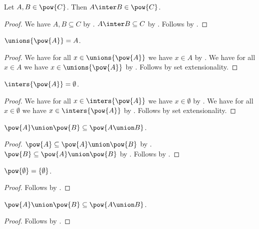 \begin{proposition}\label{inter_powerset}
    Let $A,B\in\pow{C}$.
    Then $A\inter B\in\pow{C}$.
\end{proposition}
\begin{proof}
    We have $A,B\subseteq C$ by .
    $A\inter B\subseteq C$ by .
    Follows by .
\end{proof}

\begin{proposition}\label{unions_powerset}
    $\unions{\pow{A}} = A$.
\end{proposition}
\begin{proof}
    We have for all $x\in\unions{\pow{A}}$
        we have $x\in A$ by .
    We have for all $x\in A$
        we have $x\in\unions{\pow{A}}$ by .
    Follows by set extensionality.
\end{proof}

\begin{proposition}\label{inters_powerset}
    $\inters{\pow{A}} = \emptyset$.
\end{proposition}
\begin{proof}
    We have for all $x\in\inters{\pow{A}}$
        we have $x\in\emptyset$
        by .
    We have for all $x\in\emptyset$
        we have $x\in\inters{\pow{A}}$ by .
    Follows by set extensionality.
\end{proof}

\begin{proposition}\label{union_powersets_subseteq}
    $\pow{A}\union\pow{B} \subseteq \pow{A\union B}$.
\end{proposition}
\begin{proof}
    $\pow{A}\subseteq \pow{A}\union\pow{B}$ by .
    $\pow{B}\subseteq \pow{A}\union\pow{B}$ by .
    Follows by .
\end{proof}

\begin{proposition}\label{powerset_emptyset}
    $\pow{\emptyset} = \{\emptyset\}$.
\end{proposition}
\begin{proof}
    Follows by
    .
\end{proof}

\begin{proposition}\label{powerset_union_subseteq}
    $\pow{A}\union\pow{B}\subseteq \pow{A\union B}$.
\end{proposition}
\begin{proof}
    Follows by .
\end{proof}

